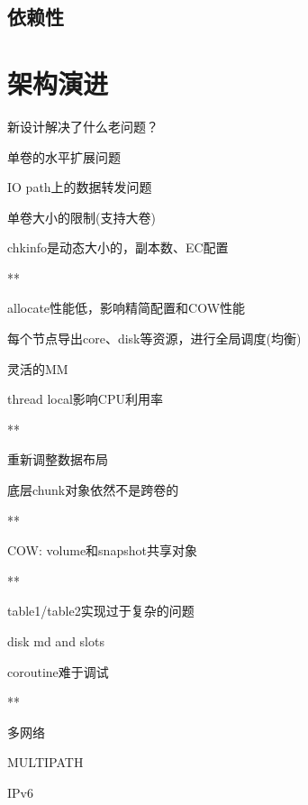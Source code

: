 

\subsection{依赖性}



\section{架构演进}

新设计解决了什么老问题？
\begin{enumbox}
\item 单卷的水平扩展问题
\item IO path上的数据转发问题
\item 单卷大小的限制(支持大卷)
\item chkinfo是动态大小的，副本数、EC配置
\item ***
\item allocate性能低，影响精简配置和COW性能
\item 每个节点导出core、disk等资源，进行全局调度(均衡)
\item 灵活的MM
\item thread local影响CPU利用率
\item ***
\item 重新调整数据布局
\item 底层chunk对象依然不是跨卷的
\item ***
\item COW: volume和snapshot共享对象
\item ***
\item table1/table2实现过于复杂的问题
\item disk md and slots
\item coroutine难于调试
\item ***
\item 多网络
\item MULTIPATH
\item IPv6
\end{enumbox}


